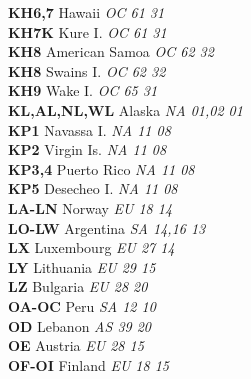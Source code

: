 ﻿\documentclass[landscape,a4paper]{article}
\begin{document}
\begin{multicols}{6}
\textbf{KH6,7                   } Hawaii                             \emph{ OC     61     31    } \\
\textbf{KH7K                    } Kure I.                            \emph{ OC     61     31    } \\
\textbf{KH8                     } American Samoa                     \emph{ OC     62     32    } \\
\textbf{KH8                     } Swains I.                          \emph{ OC     62     32    } \\
\textbf{KH9                     } Wake I.                            \emph{ OC     65     31    } \\
\textbf{KL,AL,NL,WL             } Alaska                             \emph{ NA     01,02  01    } \\
\textbf{KP1                     } Navassa I.                         \emph{ NA     11     08    } \\
\textbf{KP2                     } Virgin Is.                         \emph{ NA     11     08    } \\
\textbf{KP3,4                   } Puerto Rico                        \emph{ NA     11     08    } \\
\textbf{KP5                     } Desecheo I.                        \emph{ NA     11     08    } \\
\textbf{LA-LN                   } Norway                             \emph{ EU     18     14    } \\
\textbf{LO-LW                   } Argentina                          \emph{ SA     14,16  13    } \\
\textbf{LX                      } Luxembourg                         \emph{ EU     27     14    } \\
\textbf{LY                      } Lithuania                          \emph{ EU     29     15    } \\
\textbf{LZ                      } Bulgaria                           \emph{ EU     28     20    } \\
\textbf{OA-OC                   } Peru                               \emph{ SA     12     10    } \\
\textbf{OD                      } Lebanon                            \emph{ AS     39     20    } \\
\textbf{OE                      } Austria                            \emph{ EU     28     15    } \\
\textbf{OF-OI                   } Finland                            \emph{ EU     18     15    } \\

\end{multicols}
\end{document}
